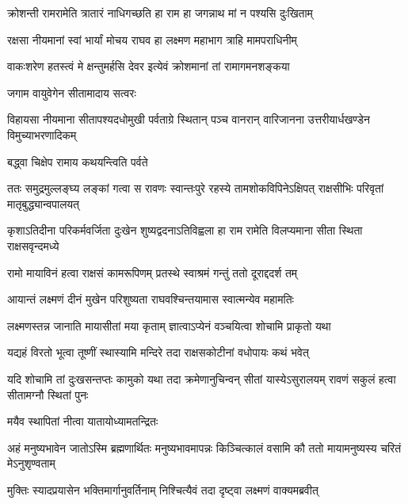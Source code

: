 \twolineshloka
{क्रोशन्ती रामरामेति त्रातारं नाधिगच्छति}
{हा राम हा जगन्नाथ मां न पश्यसि दुःखिताम्} %

\twolineshloka
{रक्षसा नीयमानां स्वां भार्यां मोचय राघव}
{हा लक्ष्मण महाभाग त्राहि मामपराधिनीम्} %

\twolineshloka
{वाकःशरेण हतस्त्वं मे क्षन्तुमर्हसि देवर}
{इत्येवं क्रोशमानां तां रामागमनशङ्कया} %

\onelineshloka
{जगाम वायुवेगेन सीतामादाय सत्वरः} %


\threelineshloka
{विहायसा नीयमाना सीतापश्यदधोमुखी}
{पर्वताग्रे स्थितान् पञ्च वानरान् वारिजानना}
{उत्तरीयार्धखण्डेन विमुच्याभरणादिकम्} %

\onelineshloka
{बद्ध्वा चिक्षेप रामाय कथयन्त्विति पर्वते} %


\threelineshloka
{ततः समुद्रमुल्लङ्घ्य लङ्कां गत्वा स रावणः}
{स्वान्तःपुरे रहस्ये तामशोकविपिनेऽक्षिपत्}
{राक्षसीभिः परिवृतां मातृबुद्ध्यान्वपालयत्} %

\fourlineindentedshloka
{कृशाऽतिदीना परिकर्मवर्जिता}
{दुःखेन शुष्यद्वदनाऽतिविह्वला}
{हा राम रामेति विलप्यमाना}
{सीता स्थिता राक्षसवृन्दमध्ये} %






\twolineshloka
{रामो मायाविनं हत्वा राक्षसं कामरूपिणम्}
{प्रतस्थे स्वाश्रमं गन्तुं ततो दूराद्ददर्श तम्} %

\twolineshloka
{आयान्तं लक्ष्मणं दीनं मुखेन परिशुष्यता}
{राघवश्चिन्तयामास स्वात्मन्येव महामतिः} %

\twolineshloka
{लक्ष्मणस्तन्न जानाति मायासीतां मया कृताम्}
{ज्ञात्वाऽप्येनं वञ्चयित्वा शोचामि प्राकृतो यथा} %

\twolineshloka
{यद्यहं विरतो भूत्वा तूष्णीं स्थास्यामि मन्दिरे}
{तदा राक्षसकोटीनां वधोपायः कथं भवेत्} %

\threelineshloka
{यदि शोचामि तां दुःखसन्तप्तः कामुको यथा}
{तदा क्रमेणानुचिन्वन् सीतां यास्येऽसुरालयम्}
{रावणं सकुलं हत्वा सीतामग्नौ स्थितां पुनः} %

\onelineshloka
{मयैव स्थापितां नीत्वा यातायोध्यामतन्द्रितः} %


\threelineshloka
{अहं मनुष्यभावेन जातोऽस्मि ब्रह्मणार्थितः}
{मनुष्यभावमापन्नः किञ्चित्कालं वसामि कौ}
{ततो मायामनुष्यस्य चरितं मेऽनुशृण्वताम्} %

\twolineshloka
{मुक्तिः स्यादप्रयासेन भक्तिमार्गानुवर्तिनाम्}
{निश्चित्यैवं तदा दृष्ट्वा लक्ष्मणं वाक्यमब्रवीत्} %

